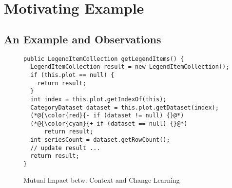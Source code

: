 \section{Motivating Example}
\label{motiv:sec}

\subsection{An Example and Observations}

\begin{figure}[t]
	\centering
	\begin{lstlisting}[]
public LegendItemCollection getLegendItems() {
  LegendItemCollection result = new LegendItemCollection();
  if (this.plot == null) {
    return result;
  }
  int index = this.plot.getIndexOf(this);
  CategoryDataset dataset = this.plot.getDataset(index);
  (*@{\color{red}{- if (dataset != null) {}@*)
  (*@{\color{cyan}{+ if (dataset == null) {}@*)
      return result;
  int seriesCount = dataset.getRowCount();
  // update result ...
  return result;
}
	\end{lstlisting}
        \vspace{-9pt}
        \caption{Mutual Impact betw. Context and Change Learning}
        \vspace{-8pt}
        \label{fig:motiv}
\end{figure}


